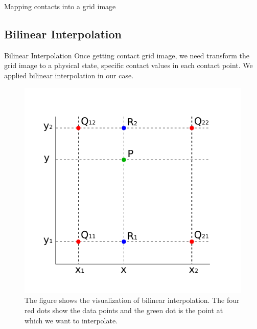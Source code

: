 \documentclass{beamer}
\begin{document}
\begin{frame}{Mapping contacts into a grid image}
\begin{algorithm}[H]
\end{algorithm}
\end{frame}

\subsection{Bilinear Interpolation}
\begin{frame}{Bilinear Interpolation}
Once getting contact grid image, we need transform the grid image to a physical state, specific contact values in each contact point. We applied bilinear interpolation in our case.
\pause
\begin{figure}
        \centering
        \includegraphics[scale = 0.5]{../report/Figures/inp}
        \caption{The figure shows the visualization of bilinear interpolation. The four red dots show the data points and the green dot is the point at which we want to interpolate.}
\end{figure}
\end{frame}
\end{document}
